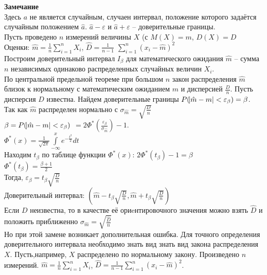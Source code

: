 \documentclass[russian, 12pt, fleqn]{article}
\begin{document}
\textbf{Замечание\ } \\
Здесь $a$ не является случайным, случаен интервал, положение которого задаётся случайным положением $\hat{a}$.
$ \hat{a} - \varepsilon$ и $\hat{a} + \varepsilon$ -- доверительные границы.\\
Пусть проведено  $n$ измерений величины $X$ (с $M(X)=m$, $D(X) = D$\\
 Оценки:  $\hat{m}= \frac{1}{n} \displaystyle{\sum\limits_{i=1} ^ {n}} X_i$, $\hat{D} = \frac{1}{n - 1}$  $\displaystyle{\sum \limits_{i=1} ^ {n}} (x_i - \hat{m})^2$\\
Построим доверительный интервал $I_\beta$ для математического ожидания $\hat{m}$ -- сумма $n$ независимых одинаково распределенных случайных величин $X_i$. \\
По центральной предельной теореме при большом $n$ закон распределения $\hat{m}$ близок к нормальному с математическим ожиданием $m$ и дисперсией $\frac{D}{n}$. Пусть дисперсия $D$ известна. Найдем доверительные границы $P(\abs{\hat{m} - m} < \varepsilon_\beta) = \beta$. 
Так как $\hat{m}$ распределен нормально с $\sigma_{\hat{m}} = \sqrt{\frac{D}{n}}$\\
$\beta = P(\abs{\hat{m} - m} < \varepsilon_\beta)$
$ = 2\Phi^*(\frac{\varepsilon_\beta}{\sigma_{\hat{m}}}) - 1$.\\
$\Phi^*(x) = \frac{1}{\sqrt{2\pi}} \displaystyle{\int \limits _{-\infty} ^ {x}} e^{-\frac{t^2}{2}} dt$\\
Находим $t_\beta$ по таблице функции $\Phi^*(x)$: $2\Phi^*(t_\beta) - 1 = \beta$\\
$\Phi^*(t_\beta) = \frac{\beta + 1}{2}$\\
Тогда, $\varepsilon_\beta = t_{\beta} \sqrt{\frac{D}{n}}$\\
Доверительный интервал: $(\hat{m} - t_\beta \sqrt{\frac{D}{n}}, \hat{m} + t_\beta \sqrt{\frac{D}{n}})$\\
Если $D$ неизвестна, то в качестве её ориeнтировочного значения  можно взять $\hat{D}$ и положить приближенно $\sigma_{\hat{m}} = \sqrt{ \frac{\hat{D}}{n} }$\\
Но при этой замене возникает дополнительная ошибка. Для точного определения доверительного интервала необходимо знать вид знать вид закона распределения $X$.
Пусть,например, $X$ 
распределено по нормальному закону. Произведено $n$ измерений. $\hat{m} = \frac{1}{n} \displaystyle{\sum \limits_{i=1} ^ {n} } X_i$, $\hat{D} = \frac{1}{n - 1} \displaystyle{\sum \limits_{i=1} ^ {n} } (x_i - \hat{m})^2$.\\
\end{document}
